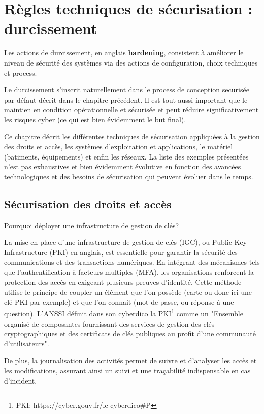\section{Règles techniques de sécurisation : durcissement}

Les actions de durcissement, en anglais \textbf{hardening}, consistent à améliorer le niveau de sécurité des systèmes via des actions de configuration, choix techniques et process.

Le durcissement s'inscrit naturellement dans le process de conception securisée par défaut décrit dans le chapitre précédent. Il est tout aussi important que le maintien en condition opérationnelle et sécurisée et peut réduire significativement les risques cyber (ce qui est bien évidemment le but final).

Ce chapitre décrit les différentes techniques de sécurisation appliquées à la gestion des droits et accès, les systèmes d'exploitation et applications, le matériel (batiments, équipements) et enfin les réseaux.
La liste des exemples présentées n'est pas exhaustives et bien évidemment évolutive en fonction des avancées technologiques et des besoins de sécurisation qui peuvent évoluer dans le temps.

\subsection{Sécurisation des droits et accès} 

Pourquoi déployer une infrastructure de gestion de clés?

La mise en place d'une infrastructure de gestion de clés (IGC), ou Public Key Infrastructure (PKI) en anglais, est essentielle pour garantir la sécurité des communications et des transactions numériques. En intégrant des mécanismes tels que l'authentification à facteurs multiples (MFA), les organisations renforcent la protection des accès en exigeant plusieurs preuves d'identité. Cette méthode utilise le principe de coupler un élément que l'on possède (carte ou donc ici une clé PKI par exemple) et que l'on connait (mot de passe, ou réponse à une question).
L'ANSSI définit dans son cyberdico la PKI\footnote{PKI: https://cyber.gouv.fr/le-cyberdico\#P} comme un "Ensemble organisé de composantes fournissant des services de gestion des clés cryptographiques et des certificats de clés publiques au profit d’une communauté d’utilisateurs". 

De plus, la journalisation des activités permet de suivre et d'analyser les accès et les modifications, assurant ainsi un suivi et une traçabilité indispensable en cas d'incident. 

